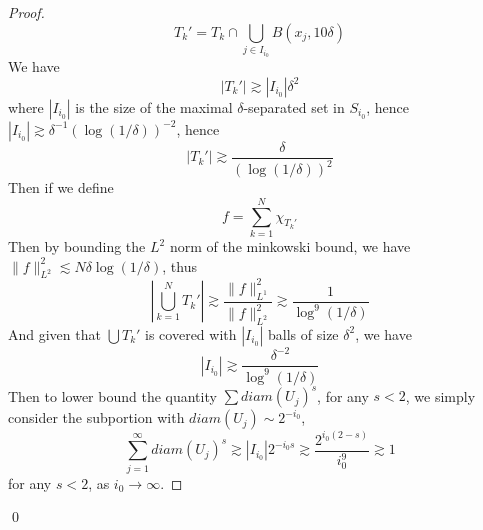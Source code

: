 \begin{proof}
\begin{equation*}
        T_k'=T_k\cap \bigcup_{j\in I_{i_0}}B(x_j, 10\delta)
    \end{equation*}
    We have 
    \begin{equation*}
        |T_k'|\gtrsim |I_{i_0}|\delta^2
    \end{equation*}
    where $|I_{i_0}|$ is the size of the maximal $\delta$-separated set in $S_{i_0}$, hence $|I_{i_0}|\gtrsim \delta^{-1}(\log(1/\delta))^{-2}$, hence 
    \begin{equation*}
        |T_k'|\gtrsim\frac{\delta}{(\log(1/\delta))^{2}}
    \end{equation*}
    Then if we define
    \begin{equation*}
        f=\sum_{k=1}^N\chi_{T_k'}
    \end{equation*}
    Then by bounding the $L^2$ norm of the minkowski bound, we have $\|f\|_{L^2}^2\lesssim N\delta\log(1/\delta)$, thus 
    \begin{equation*}
        \left|\bigcup_{k=1}^NT_k'\right|\gtrsim \frac{\|f\|_{L^1}^2}{\|f\|_{L^2}^2}\gtrsim\frac{1}{\log^9(1/\delta)}
    \end{equation*}
    And given that $\bigcup T_k'$ is covered with $|I_{i_0}|$ balls of size $\delta^2$, we have 
    \begin{equation*}
        |I_{i_0}|\gtrsim\frac{\delta^{-2}}{\log^9(1/\delta)}
    \end{equation*}
    Then to lower bound the quantity $\sum diam(U_j)^s$, for any $s<2$, we simply consider the subportion with $diam(U_j)\sim 2^{-i_0}$, 
    \begin{equation*}
        \sum_{j=1}^\infty diam(U_j)^s\gtrsim |I_{i_0}|2^{-i_0s}\gtrsim \frac{2^{i_0(2-s)}}{i_0^9}\gtrsim 1
    \end{equation*}
    for any $s<2$, as $i_0\to\infty$.
\end{proof}
\qed


